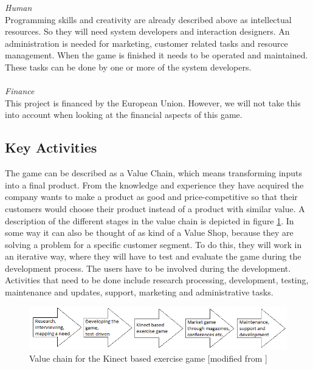 \emph{Human} \\ Programming skills and creativity are already described above as intellectual resources. So they will need system developers and interaction designers. An administration is needed for marketing, customer related tasks and resource management. When the game is finished it needs to be operated and maintained. These tasks can be done by one or more of the system developers. \\ \\
\emph{Finance} \\ This project is financed by the European Union. However, we will not take this into account when looking at the financial aspects of this game.

\subsection{Key Activities}
The game can be described as a Value Chain, which means transforming inputs into a final product. From the knowledge and experience they have acquired the company wants to make a product as good and price-competitive so that their customers would choose their product instead of a product with similar value. A description of the different stages in the value chain is depicted in figure \ref{fig:ValueChainCase}. In some way it can also be thought of as kind of a Value Shop, because they are solving a problem for a specific customer segment. To do this, they will work in an iterative way, where they will have to test and evaluate the game during the development process. The users have to be involved during the development. 
Activities that need to be done include research processing, development, testing, maintenance and updates, support, marketing and administrative tasks. 
\begin{figure}
\label{fig:ValueChainCase}
\begin{center}
\includegraphics[scale=0.7]{valuechaincase}
\caption[Value Chain for the Kinect Based Exercise Game]{Value chain for the Kinect based exercise game [modified from \cite{osterwalderthesis}]}
\end{center}
\end{figure}
\newpage

